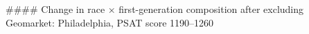 #### Change in race × first-generation composition after excluding Geomarket: Philadelphia, PSAT score 1190–1260
